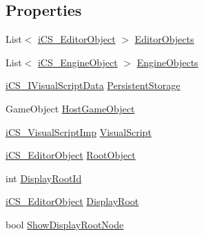 \subsection*{Properties}
\begin{DoxyCompactItemize}
\item 
List$<$ \hyperlink{classi_c_s___editor_object}{i\+C\+S\+\_\+\+Editor\+Object} $>$ \hyperlink{classi_c_s___i_storage_a3e4bd531361f5f6f3394bb5bf183c947}{Editor\+Objects}
\item 
List$<$ \hyperlink{classi_c_s___engine_object}{i\+C\+S\+\_\+\+Engine\+Object} $>$ \hyperlink{classi_c_s___i_storage_a9337d4a89b0fa806dace70151550c742}{Engine\+Objects}
\item 
\hyperlink{interfacei_c_s___i_visual_script_data}{i\+C\+S\+\_\+\+I\+Visual\+Script\+Data} \hyperlink{classi_c_s___i_storage_a62b17e531f5d6378d7dda2e63f6a6ac9}{Persistent\+Storage}
\item 
Game\+Object \hyperlink{classi_c_s___i_storage_a113534f5ba28b9c3f8d3630f38c71483}{Host\+Game\+Object}
\item 
\hyperlink{classi_c_s___visual_script_imp}{i\+C\+S\+\_\+\+Visual\+Script\+Imp} \hyperlink{classi_c_s___i_storage_a8b5736e6de84005b894a63649b327fe0}{Visual\+Script}
\item 
\hyperlink{classi_c_s___editor_object}{i\+C\+S\+\_\+\+Editor\+Object} \hyperlink{classi_c_s___i_storage_ae74ae37331da5bd5bbdf51a47e6ea518}{Root\+Object}
\item 
int \hyperlink{classi_c_s___i_storage_ac44bf00e5dfe4f3061a398833b8d7f7b}{Display\+Root\+Id}
\item 
\hyperlink{classi_c_s___editor_object}{i\+C\+S\+\_\+\+Editor\+Object} \hyperlink{classi_c_s___i_storage_ab9fac25f77fb67e6f6e6e540228cca91}{Display\+Root}
\item 
bool \hyperlink{classi_c_s___i_storage_a94ed8359523d65e59accda52e3d6f8c1}{Show\+Display\+Root\+Node}

\end{DoxyCompactItemize}
